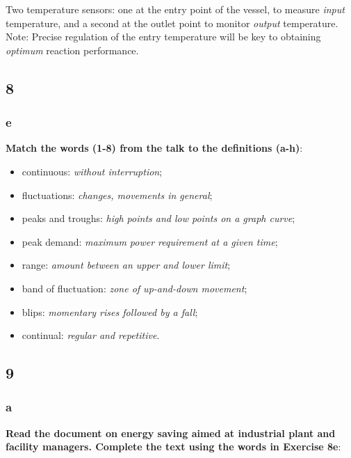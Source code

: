 Two temperature sensors: one at the entry point of the vessel, to measure \textit{input} temperature, and a second at the outlet point to monitor \textit{output} temperature. Note: Precise regulation of the entry temperature will be key to obtaining \textit{optimum} reaction performance.

\subsection{8}

\subsubsection{e}

\textbf{Match the words (1-8) from the talk to the definitions (a-h)}:

\begin{itemize}

\item continuous: \textit{without interruption};
\item fluctuations: \textit{changes, movements in general};
\item peaks and troughs: \textit{high points and low points on a graph curve};
\item peak demand: \textit{maximum power requirement at a given time};
\item range: \textit{amount between an upper and lower limit};
\item band of fluctuation: \textit{zone of up-and-down movement};
\item blips: \textit{momentary rises followed by a fall};
\item continual: \textit{regular and repetitive}.

\end{itemize}

\subsection{9}

\subsubsection{a}

\textbf{Read the document on energy saving aimed at industrial plant and facility managers. Complete the text using the words in Exercise 8e}:

